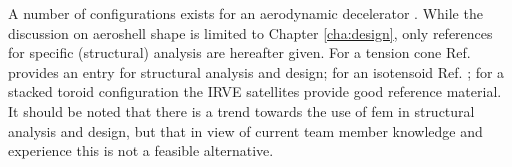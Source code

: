 A number of configurations exists for an aerodynamic decelerator \cite{Smith2010}. While the discussion on aeroshell shape is limited to Chapter \ref{cha:design}, only references for specific (structural) analysis are hereafter given. For a tension cone Ref. \cite{Yamada2009} provides an entry for structural analysis and design; for an isotensoid Ref. \cite{Smith2011}; for a stacked toroid configuration the IRVE satellites provide good reference material. It should be noted that there is a trend towards the use of \gls{fem} in structural analysis and design, but that in view of current team member knowledge and experience this is not a feasible alternative.













